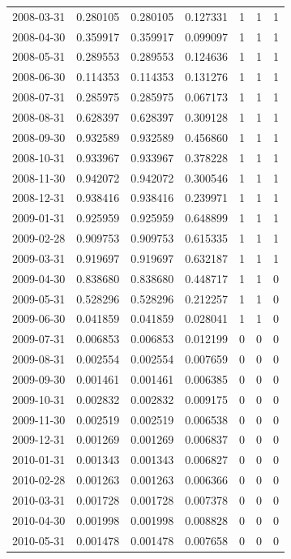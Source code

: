 \documentclass[conference,onecolumn]{IEEEtran}
\begin{document}
\begin{longtable}{|c|c|c|c|c|c|c|}
2008-03-31 & 0.280105 & 0.280105 & 0.127331 & 1 & 1 & 1 \\
2008-04-30 & 0.359917 & 0.359917 & 0.099097 & 1 & 1 & 1 \\
2008-05-31 & 0.289553 & 0.289553 & 0.124636 & 1 & 1 & 1 \\
2008-06-30 & 0.114353 & 0.114353 & 0.131276 & 1 & 1 & 1 \\
2008-07-31 & 0.285975 & 0.285975 & 0.067173 & 1 & 1 & 1 \\
2008-08-31 & 0.628397 & 0.628397 & 0.309128 & 1 & 1 & 1 \\
2008-09-30 & 0.932589 & 0.932589 & 0.456860 & 1 & 1 & 1 \\
2008-10-31 & 0.933967 & 0.933967 & 0.378228 & 1 & 1 & 1 \\
2008-11-30 & 0.942072 & 0.942072 & 0.300546 & 1 & 1 & 1 \\
2008-12-31 & 0.938416 & 0.938416 & 0.239971 & 1 & 1 & 1 \\
2009-01-31 & 0.925959 & 0.925959 & 0.648899 & 1 & 1 & 1 \\
2009-02-28 & 0.909753 & 0.909753 & 0.615335 & 1 & 1 & 1 \\
2009-03-31 & 0.919697 & 0.919697 & 0.632187 & 1 & 1 & 1 \\
2009-04-30 & 0.838680 & 0.838680 & 0.448717 & 1 & 1 & 0 \\
2009-05-31 & 0.528296 & 0.528296 & 0.212257 & 1 & 1 & 0 \\
2009-06-30 & 0.041859 & 0.041859 & 0.028041 & 1 & 1 & 0 \\
2009-07-31 & 0.006853 & 0.006853 & 0.012199 & 0 & 0 & 0 \\
2009-08-31 & 0.002554 & 0.002554 & 0.007659 & 0 & 0 & 0 \\
2009-09-30 & 0.001461 & 0.001461 & 0.006385 & 0 & 0 & 0 \\
2009-10-31 & 0.002832 & 0.002832 & 0.009175 & 0 & 0 & 0 \\
2009-11-30 & 0.002519 & 0.002519 & 0.006538 & 0 & 0 & 0 \\
2009-12-31 & 0.001269 & 0.001269 & 0.006837 & 0 & 0 & 0 \\
2010-01-31 & 0.001343 & 0.001343 & 0.006827 & 0 & 0 & 0 \\
2010-02-28 & 0.001263 & 0.001263 & 0.006366 & 0 & 0 & 0 \\
2010-03-31 & 0.001728 & 0.001728 & 0.007378 & 0 & 0 & 0 \\
2010-04-30 & 0.001998 & 0.001998 & 0.008828 & 0 & 0 & 0 \\
2010-05-31 & 0.001478 & 0.001478 & 0.007658 & 0 & 0 & 0 \\

\end{longtable}
\end{document}
